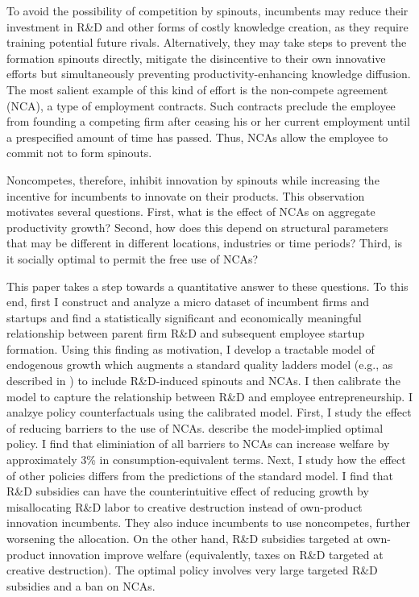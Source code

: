 \documentclass[11pt,english]{article}
\begin{document}
To avoid the possibility of competition by spinouts, incumbents may reduce their investment in R\&D and other forms of costly knowledge creation, as they require training potential future rivals. Alternatively, they may take steps to prevent the formation spinouts directly, mitigate the disincentive to their own innovative efforts but simultaneously preventing productivity-enhancing knowledge diffusion. The most salient example of this kind of effort is the non-compete agreement (NCA), a type of employment contracts. Such contracts preclude the employee from founding a competing firm after ceasing his or her current employment until a prespecified amount of time has passed. Thus, NCAs allow the employee to commit not to form spinouts. 

Noncompetes, therefore, inhibit innovation by spinouts while increasing the incentive for incumbents to innovate on their products. This observation motivates several questions. First, what is the effect of NCAs on aggregate productivity growth? Second, how does this depend on structural parameters that may be different in different locations, industries or time periods? Third, is it socially optimal to permit the free use of NCAs?

This paper takes a step towards a quantitative answer to these questions. To this end, first I construct and analyze a micro dataset of incumbent firms and startups and find a statistically significant and economically meaningful relationship between parent firm R\&D and subsequent employee startup formation. Using this finding as motivation, I develop a tractable model of endogenous growth which augments a standard quality ladders model (e.g., as described in \cite{acemoglu_introduction_2009}) to include R\&D-induced spinouts and NCAs. I then calibrate the model to capture the relationship between R\&D and employee entrepreneurship. I analzye policy counterfactuals using the calibrated model. First, I study the effect of reducing barriers to the use of NCAs. describe the model-implied optimal policy. I find that eliminiation of all barriers to NCAs can increase welfare by approximately 3\% in consumption-equivalent terms.  Next, I study how the effect of other policies differs from the predictions of the standard model. I find that R\&D subsidies can have the counterintuitive effect of reducing growth by misallocating R\&D labor to creative destruction instead of own-product innovation incumbents. They also induce incumbents to use noncompetes, further worsening the allocation. On the other hand, R\&D subsidies targeted at own-product innovation improve welfare (equivalently, taxes on R\&D targeted at creative destruction). The optimal policy involves very large targeted R\&D subsidies and a ban on NCAs. 
\end{document}
